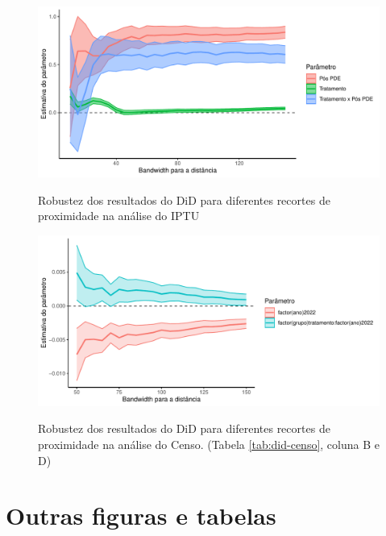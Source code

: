 \begin{apendicesenv}
\begin{figure}[!h]
    \centering
    \caption{Robustez dos resultados do DiD para diferentes recortes de proximidade na análise do IPTU}
    \includegraphics[width = \linewidth]{figuras/did-IPTU-bandas.pdf}
    \label{fig:robustez-did-IPTU}
\end{figure}

\begin{figure}[!h]
    \centering
    \caption{Robustez dos resultados do DiD para diferentes recortes de proximidade na análise do Censo. (Tabela \ref{tab:did-censo}, coluna B e D)}
    \includegraphics[width = \linewidth]{figuras/did-censo-bandas.pdf}
    \label{fig:robustez-did-censo}
\end{figure}















\chapter{Outras figuras e tabelas}
\label{appendix:figuras}


\end{apendicesenv}

